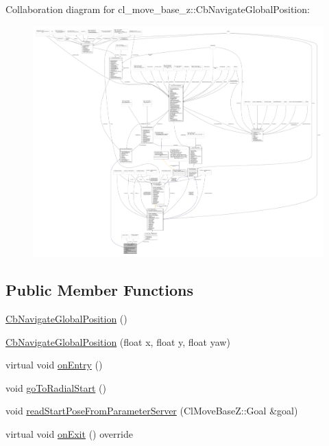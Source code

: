 Collaboration diagram for cl\+\_\+move\+\_\+base\+\_\+z\+:\+:Cb\+Navigate\+Global\+Position\+:
\nopagebreak
\begin{figure}[H]
\begin{center}
\leavevmode
\includegraphics[width=350pt]{classcl__move__base__z_1_1CbNavigateGlobalPosition__coll__graph}
\end{center}
\end{figure}
\subsection*{Public Member Functions}
\begin{DoxyCompactItemize}
\item 
\hyperlink{classcl__move__base__z_1_1CbNavigateGlobalPosition_aec75d2481b2057bbbdad9513c4dc08cd}{Cb\+Navigate\+Global\+Position} ()
\item 
\hyperlink{classcl__move__base__z_1_1CbNavigateGlobalPosition_a79d42c0eeee48af5e73d917fa2d5b4f5}{Cb\+Navigate\+Global\+Position} (float x, float y, float yaw)
\item 
virtual void \hyperlink{classcl__move__base__z_1_1CbNavigateGlobalPosition_a66d8b0555ef2945bc108dcd5171be292}{on\+Entry} ()
\item 
void \hyperlink{classcl__move__base__z_1_1CbNavigateGlobalPosition_a489aaab9282dea9253fcf6b02e5f8aa4}{go\+To\+Radial\+Start} ()
\item 
void \hyperlink{classcl__move__base__z_1_1CbNavigateGlobalPosition_a868b25f238e3781c9a2e44b4e1502fcc}{read\+Start\+Pose\+From\+Parameter\+Server} (Cl\+Move\+Base\+Z\+::\+Goal \&goal)
\item 
virtual void \hyperlink{classcl__move__base__z_1_1CbNavigateGlobalPosition_a5c18268af1e7fc236aa155a58345d5d7}{on\+Exit} () override
\end{DoxyCompactItemize}
